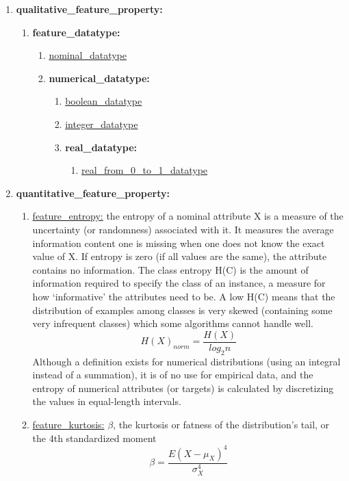 \documentclass[a4paper,12pt, english]{article}
\begin{document}
\begin{enumerate}
\begin{enumerate}
\begin{enumerate}
		\begin{enumerate}
		\item \textbf{qualitative\_feature\_property:}
			\begin{enumerate}
			\item \textbf{feature\_datatype:}
				\begin{enumerate}
				\item \underline{nominal\_datatype}
				\item \textbf{numerical\_datatype:}
					\begin{enumerate}
					\item \underline{boolean\_datatype}
					\item \underline{integer\_datatype}
					\item \textbf{real\_datatype:}
						\begin{enumerate}
						\item \underline{real\_from\_0\_to\_1\_datatype}
						\end{enumerate}					
					\end{enumerate}				
				\end{enumerate}			
			\end{enumerate}		
		\item \textbf{quantitative\_feature\_property:}
			\begin{enumerate}
			\item \underline{feature\_entropy:} the entropy of a nominal attribute X is a measure of the uncertainty (or randomness) associated with it. It measures the average information content one is missing when one does not know the exact value of X. If entropy is zero (if all values are the same), the attribute contains no information. The class entropy H(C) is the amount of information required to specify the class of an instance, a measure for how ‘informative’ the attributes need to be. A low H(C) means that the distribution of examples among classes is very skewed (containing some very infrequent classes) which some algorithms cannot handle well. \begin{equation} H(X)_{norm}=\frac{H(X)}{log_{2}n} \end{equation} Although a definition exists for numerical distributions (using an integral instead of a summation), it is of no use for empirical data, and the entropy of numerical attributes (or targets) is calculated by discretizing the values in equal-length intervals.
			\item \underline{feature\_kurtosis:}  $\beta$, the kurtosis or fatness of the distribution's tail, or the 4th standardized moment \begin{equation} \beta=\frac{E(X-\mu_{X})^{4}}{\sigma_{X}^{4}} \end{equation}

\end{enumerate}
\end{enumerate}
\end{enumerate}
\end{enumerate}
\end{enumerate}
\end{document}
